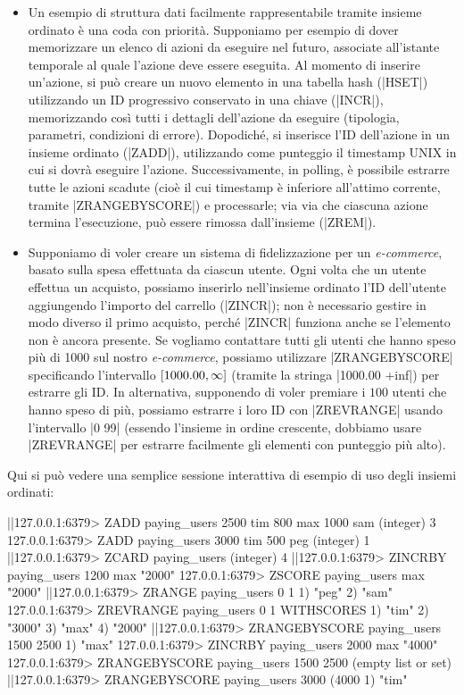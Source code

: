 \begin{itemize}
	\item Un esempio di struttura dati facilmente rappresentabile tramite insieme ordinato è una
	coda con priorità. Supponiamo per esempio di dover memorizzare un elenco di azioni da eseguire
	nel futuro, associate all'istante temporale al quale l'azione deve essere eseguita. Al momento
	di inserire un'azione, si può creare un nuovo elemento in una tabella hash (\cverb|HSET|)
	utilizzando un ID progressivo conservato in una chiave (\cverb|INCR|), memorizzando così tutti
	i dettagli dell'azione da eseguire (tipologia, parametri, condizioni di errore). Dopodiché,
	si inserisce l'ID dell'azione in un insieme ordinato (\cverb|ZADD|), utilizzando come punteggio
	il timestamp UNIX in cui si dovrà eseguire l'azione. Successivamente, in polling, è possibile
	estrarre tutte le azioni scadute (cioè il cui timestamp è inferiore all'attimo corrente,
	tramite \cverb|ZRANGEBYSCORE|) e processarle; via via che ciascuna azione termina l'esecuzione,
	può essere rimossa dall'insieme (\cverb|ZREM|).

	\item Supponiamo di voler creare un sistema di fidelizzazione per un \emph{e-commerce}, basato sulla
	spesa effettuata da ciascun utente. Ogni volta che un utente effettua un acquisto, possiamo
	inserirlo nell'insieme ordinato l'ID dell'utente aggiungendo l'importo del carrello
	(\cverb|ZINCR|); non è necessario gestire in modo diverso il primo acquisto, perché \cverb|ZINCR|
	funziona anche se l'elemento non è ancora presente. Se vogliamo contattare tutti gli utenti che
	hanno speso più di \SI{1000}{\EUR} sul nostro \emph{e-commerce}, possiamo utilizzare
	\cverb|ZRANGEBYSCORE| specificando l'intervallo $\interval{1000.00}{\infty}$ (tramite la stringa
	\cverb|1000.00 +inf|) per estrarre gli ID. In alternativa, supponendo di voler premiare i
	$100$ utenti che hanno speso di più, possiamo estrarre i loro ID con \cverb|ZREVRANGE| usando
	l'intervallo \cverb|0 99| (essendo l'insieme in ordine crescente, dobbiamo usare
	\cverb|ZREVRANGE| per estrarre facilmente gli elementi con punteggio più alto).
\end{itemize}

Qui si può vedere una semplice sessione interattiva di esempio di uso degli insiemi ordinati:

\begin{commentedsource}[style=redis]
|\lnote|127.0.0.1:6379> ZADD paying_users 2500 tim 800 max 1000 sam 
(integer) 3
127.0.0.1:6379> ZADD paying_users 3000 tim 500 peg
(integer) 1
|\lnote|127.0.0.1:6379> ZCARD paying_users
(integer) 4
|\lnote|127.0.0.1:6379> ZINCRBY paying_users 1200 max
"2000"
127.0.0.1:6379> ZSCORE paying_users max
"2000"
|\lnote|127.0.0.1:6379> ZRANGE paying_users 0 1
1) "peg"
2) "sam"
127.0.0.1:6379> ZREVRANGE paying_users 0 1 WITHSCORES
1) "tim"
2) "3000"
3) "max"
4) "2000"
|\lnote|127.0.0.1:6379> ZRANGEBYSCORE paying_users 1500 2500
1) "max"
127.0.0.1:6379> ZINCRBY paying_users 2000 max
"4000"
127.0.0.1:6379> ZRANGEBYSCORE paying_users 1500 2500
(empty list or set)
|\lnote|127.0.0.1:6379> ZRANGEBYSCORE paying_users 3000 (4000
1) "tim"
\end{commentedsource}

